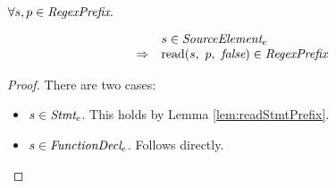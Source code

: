 \documentclass[preprint,10pt]{sigplanconf}
\begin{document}
\begin{lemma}\mbox{}
  
  \( \forall s, p \in \textit{RegexPrefix}. \)

  \[
  \begin{array}{rl}
  &s \in \textit{SourceElement}_{e} 
  \\
  \Rightarrow &
  \textrm{read}(s,~p,~\textit{false}) \in \textit{RegexPrefix}
  \end{array}
  \]
\end{lemma}
\begin{proof}
  There are two cases:
  \begin{itemize}
  \item \( s \in \textit{Stmt}_{e} \). This holds by
    Lemma \ref{lem:readStmtPrefix}.

  \item \( s \in \textit{FunctionDecl}_{e} \). Follows directly.
  \end{itemize}
\end{proof}
\end{document}
